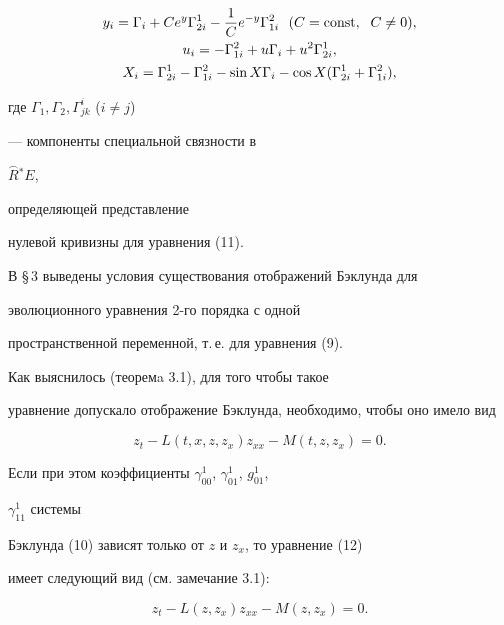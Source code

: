 \begin{notes}
\begin{gather*}
y_i=\Gamma_i+Ce^y \Gamma_{2i}^1-\frac{1}{C}e^{-y}


 \Gamma_{1i}^2\ \ ({C={\const},\ \;C \ne 0}), \\


u_i=- \Gamma_{1i}^2+u\Gamma_i+u^2 \Gamma_{2i}^1, \\


X_i=\Gamma_{2i}^1-\Gamma_{1i}^2-\sin X \Gamma_i


- \cos X ({\Gamma_{2i}^1+\Gamma_{1i}^2}), 


\end{gather*}


где $\Gamma_1,\Gamma_2,\Gamma_{jk}^i$ (${i \ne j}$)


--- компоненты специальной связности в


$\overset{\frown}{R}{}^*E$,


определяющей представление


нулевой кривизны для уравнения {(11)}.


\end{notes}





В \S\,3 выведены условия существования отображений Бэклунда для 


эволюционного уравнения 2-го порядка с одной


пространственной переменной, т.\,е. для уравнения (9). 


Как выяснилось (теоремa 3.1), для того чтобы такое


уравнение допускало отображение Бэклунда, необходимо, чтобы оно имело вид


\begin{equation}


z_t-L(t,x,z,z_x) z_{xx}-M(t,z,z_x)=0.


\end{equation}


Если при этом коэффициенты $\gamma_{00}^1$, $\gamma_{01}^1$, $g_{01}^1$,


$\gamma_{11}^1$ системы


Бэклунда (10) зависят только от $z$ и $z_x$, то уравнение (12) 


имеет следующий вид (см. замечание 3.1):


\begin{equation}


z_t-L ({z,z_x}) z_{xx}-M ({z,z_x})=0.


\end{equation}


